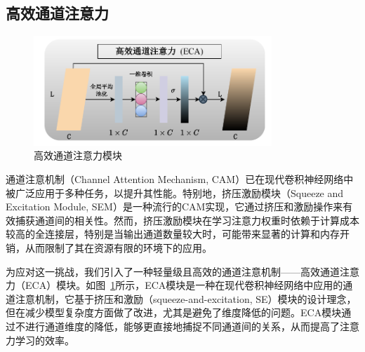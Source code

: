 

\subsection{高效通道注意力}\label{sec:background}
\begin{figure}
\centering
\includegraphics[width=0.8\textwidth]{Image/eca.pdf}
\caption{高效通道注意力模块}
\label{fig:eca}
\end{figure}

通道注意机制（Channel Attention Mechanism, CAM）已在现代卷积神经网络中被广泛应用于多种任务，以提升其性能。特别地\cite{wang2020eca}，挤压激励模块（Squeeze and Excitation Module, SEM）是一种流行的CAM实现，它通过挤压和激励操作来有效捕获通道间的相关性。然而，挤压激励模块在学习注意力权重时依赖于计算成本较高的全连接层，特别是当输出通道数量较大时，可能带来显著的计算和内存开销，从而限制了其在资源有限的环境下的应用。

为应对这一挑战，我们引入了一种轻量级且高效的通道注意机制——高效通道注意力（ECA）模块。如图~\ref{fig:eca}所示，ECA模块是一种在现代卷积神经网络中应用的通道注意机制，它基于挤压和激励（squeeze-and-excitation, SE）模块的设计理念，但在减少模型复杂度方面做了改进，尤其是避免了维度降低的问题。ECA模块通过不进行通道维度的降低，能够更直接地捕捉不同通道间的关系，从而提高了注意力学习的效率。

